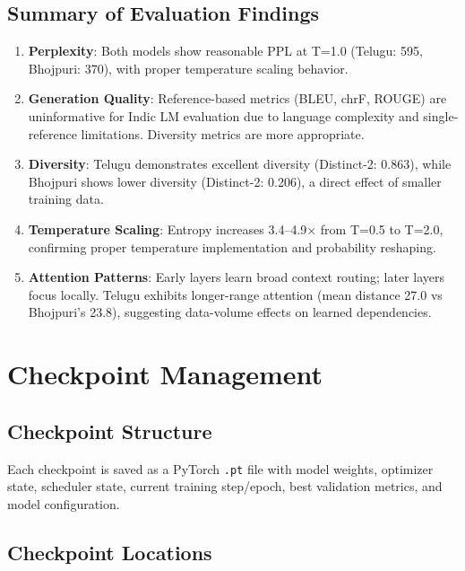 \documentclass[11pt,a4paper]{article}
\begin{document}
\subsection{Summary of Evaluation Findings}

\begin{enumerate}
    \item \textbf{Perplexity}: Both models show reasonable PPL at T=1.0 (Telugu: 595, Bhojpuri: 370), with proper temperature scaling behavior.

    \item \textbf{Generation Quality}: Reference-based metrics (BLEU, chrF, ROUGE) are uninformative for Indic LM evaluation due to language complexity and single-reference limitations. Diversity metrics are more appropriate.

    \item \textbf{Diversity}: Telugu demonstrates excellent diversity (Distinct-2: 0.863), while Bhojpuri shows lower diversity (Distinct-2: 0.206), a direct effect of smaller training data.

    \item \textbf{Temperature Scaling}: Entropy increases 3.4–4.9× from T=0.5 to T=2.0, confirming proper temperature implementation and probability reshaping.

    \item \textbf{Attention Patterns}: Early layers learn broad context routing; later layers focus locally. Telugu exhibits longer-range attention (mean distance 27.0 vs Bhojpuri's 23.8), suggesting data-volume effects on learned dependencies.
\end{enumerate}

\section{Checkpoint Management}

\subsection{Checkpoint Structure}

Each checkpoint is saved as a PyTorch \texttt{.pt} file with model weights, optimizer state, scheduler state, current training step/epoch, best validation metrics, and model configuration.

\subsection{Checkpoint Locations}
\end{document}
